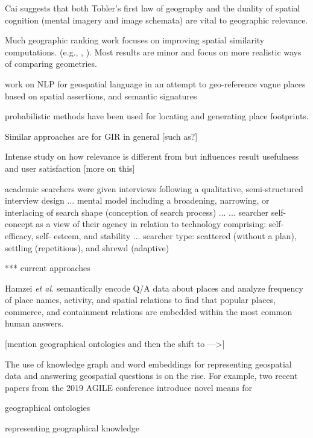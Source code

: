 Cai suggests that both Tobler's first law of geography and the duality of spatial cognition (mental imagery and image schemata) are vital to geographic relevance. \cite{Cai2011}



Much geographic ranking work focuses on improving spatial similarity computations. (e.g., \cite{Larson2004} \cite{Martins2005}, \cite{Markowetz2005}). Most results are minor and focus on more realistic ways of comparing geometries.


work on NLP for geospatial language in an attempt to geo-reference vague places based on spatial assertions, and semantic signatures
\cite{Guo2008} \cite{Liu2009} \cite{Li2012} \cite{Gao2017}

probabilistic methods have been used for locating and generating place footprints. \cite{Jones2008}

Similar approaches are for GIR in general [such as?]

Intense study on how relevance is different from but influences result usefulness and user satisfaction [more on this]
\cite{Mao2016}


\cite{Willson2014}
academic searchers were given interviews following a qualitative, semi-structured interview design
...
mental model including a broadening, narrowing, or interlacing of search shape (conception of search process)
...
... searcher self-concept as a view of their agency in relation to technology comprising: self-efficacy, self- esteem, and stability
...
searcher type: scattered (without a plan), settling (repetitious), and shrewd (adaptive)

***  current approaches



Hamzei \emph{et al.} \cite{Hamzei2019b} semantically encode \acrshort{Q/A} data about places and analyze frequency of place names, activity, and spatial relations to find that popular places, commerce, and containment relations are embedded within the most common human answers.

[mention geographical ontologies and then the shift to --->]

The use of knowledge graph and word embeddings for representing geospatial data and answering geospatial questions is on the rise. For example, two recent papers \cite {Mai2019} \cite{Dassereto2019} from the 2019 AGILE conference introduce novel means for 

geographical ontologies

representing geographical knowledge 



